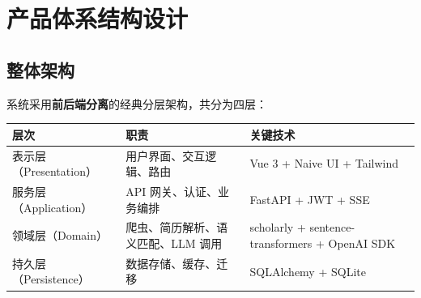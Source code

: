 \documentclass[11pt]{article}
\begin{document}







\section{产品体系结构设计}

\subsection{整体架构}

系统采用\textbf{前后端分离}的经典分层架构，共分为四层：

\begin{center}
\small
\begin{tabular}{lp{4.5cm}p{5cm}}
\toprule
\textbf{层次} & \textbf{职责} & \textbf{关键技术} \\
\midrule
表示层（Presentation） & 用户界面、交互逻辑、路由 & Vue 3 + Naive UI + Tailwind \\
服务层（Application） & API 网关、认证、业务编排 & FastAPI + JWT + SSE \\
领域层（Domain） & 爬虫、简历解析、语义匹配、LLM 调用 & scholarly + sentence-transformers + OpenAI SDK \\
持久层（Persistence） & 数据存储、缓存、迁移 & SQLAlchemy + SQLite \\
\bottomrule
\end{tabular}
\end{center}
\end{document}
